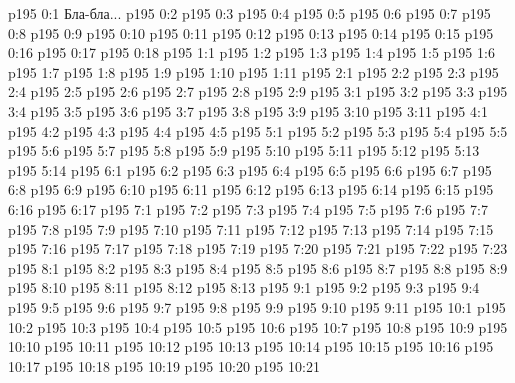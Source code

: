 \author{Промежуточные создания}
\vs p195 0:1  Бла-бла...
\vs p195 0:2 
\vs p195 0:3 
\vs p195 0:4 \pc 
\vs p195 0:5 
\vs p195 0:6 
\vs p195 0:7 
\vs p195 0:8 
\vs p195 0:9 
\vs p195 0:10 
\vs p195 0:11 \pc 
\vs p195 0:12 
\vs p195 0:13 
\vs p195 0:14 
\vs p195 0:15 
\vs p195 0:16 
\vs p195 0:17 
\vs p195 0:18 \pc 
{}
\vs p195 1:1 
\vs p195 1:2 
\vs p195 1:3 
\vs p195 1:4 
\vs p195 1:5 \pc 
\vs p195 1:6 
\vs p195 1:7 \pc 
\vs p195 1:8 
\vs p195 1:9 
\vs p195 1:10 
\vs p195 1:11 \pc 
{}
\vs p195 2:1 
\vs p195 2:2 
\vs p195 2:3 
\vs p195 2:4 
\vs p195 2:5 
\vs p195 2:6 \pc 
\vs p195 2:7 
\vs p195 2:8 
\vs p195 2:9 
\vs p195 3:1 
\vs p195 3:2 
\vs p195 3:3 
\vs p195 3:4 \pc 
\vs p195 3:5 \pc 
\vs p195 3:6 \pc 
\vs p195 3:7 \pc 
\vs p195 3:8 
\vs p195 3:9 
\vs p195 3:10 
\vs p195 3:11 
\vs p195 4:1 
\vs p195 4:2 
\vs p195 4:3 
\vs p195 4:4 \pc 
\vs p195 4:5 \pc 
{}
\vs p195 5:1 
\vs p195 5:2 
\vs p195 5:3 
\vs p195 5:4 
\vs p195 5:5 
\vs p195 5:6 
\vs p195 5:7 
\vs p195 5:8 \pc 
\vs p195 5:9 
\vs p195 5:10 
\vs p195 5:11 \pc 
\vs p195 5:12 \pc 
\vs p195 5:13 
\vs p195 5:14 \pc 
{}
\vs p195 6:1 
\vs p195 6:2 
\vs p195 6:3 
\vs p195 6:4 
\vs p195 6:5 
\vs p195 6:6 
\vs p195 6:7 
\vs p195 6:8 
\vs p195 6:9 
\vs p195 6:10 
\vs p195 6:11 
\vs p195 6:12 
\vs p195 6:13 
\vs p195 6:14 \pc 
\vs p195 6:15 
\vs p195 6:16 
\vs p195 6:17 
\vs p195 7:1 
\vs p195 7:2 
\vs p195 7:3 
\vs p195 7:4 
\vs p195 7:5 
\vs p195 7:6 
\vs p195 7:7 
\vs p195 7:8 
\vs p195 7:9 
\vs p195 7:10 
\vs p195 7:11 
\vs p195 7:12 
\vs p195 7:13 \pc 
\vs p195 7:14 \pc 
\vs p195 7:15 
\vs p195 7:16 
\vs p195 7:17 \pc 
\vs p195 7:18 \pc 
\vs p195 7:19 \pc 
\vs p195 7:20 \pc 
\vs p195 7:21 
\vs p195 7:22 
\vs p195 7:23 
\vs p195 8:1 
\vs p195 8:2 
\vs p195 8:3 
\vs p195 8:4 
\vs p195 8:5 \pc 
\vs p195 8:6 \pc 
\vs p195 8:7 
\vs p195 8:8 
\vs p195 8:9 
\vs p195 8:10 
\vs p195 8:11 
\vs p195 8:12 
\vs p195 8:13 
\vs p195 9:1 
\vs p195 9:2 
\vs p195 9:3 
\vs p195 9:4 \pc 
\vs p195 9:5 
\vs p195 9:6 \pc 
\vs p195 9:7 
\vs p195 9:8 
\vs p195 9:9 \pc 
\vs p195 9:10 
\vs p195 9:11 
\vs p195 10:1 
\vs p195 10:2 
\vs p195 10:3 \pc 
\vs p195 10:4 
\vs p195 10:5 \pc 
\vs p195 10:6 
\vs p195 10:7 
\vs p195 10:8 \pc 
\vs p195 10:9 
\vs p195 10:10 
\vs p195 10:11 
\vs p195 10:12 
\vs p195 10:13 
\vs p195 10:14 
\vs p195 10:15 
\vs p195 10:16 
\vs p195 10:17 
\vs p195 10:18 
\vs p195 10:19 
\vs p195 10:20 
\vs p195 10:21 
\quizlink
